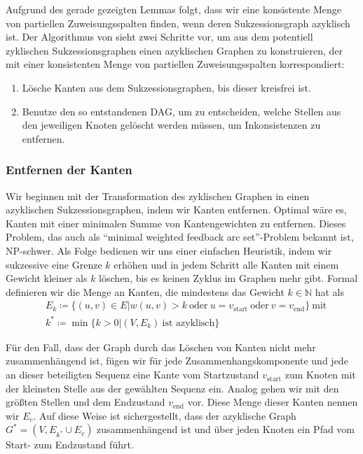 Aufgrund des gerade gezeigten Lemmas folgt, dass wir eine konsistente Menge von partiellen Zuweisungsspalten finden, wenn deren Sukzessionsgraph azyklisch ist. Der Algorithmus von \cite{pdc10} sieht zwei Schritte vor, um aus dem potentiell zyklischen Sukzessionsgraphen einen azyklischen Graphen zu konstruieren, der mit einer konsistenten Menge von partiellen Zuweisungsspalten korrespondiert:

\begin{enumerate}[topsep=0pt,itemsep=-1ex,partopsep=1ex,parsep=1ex]
	\item Lösche Kanten aus dem Sukzessionsgraphen, bis dieser kreisfrei ist.
	\item Benutze den so entstandenen DAG, um zu entscheiden, welche Stellen aus den jeweiligen Knoten gelöscht werden müssen, um Inkonsistenzen zu entfernen.
\end{enumerate}

\subsubsection{Entfernen der Kanten}

Wir beginnen mit der Transformation des zyklischen Graphen in einen azyklischen Sukzessionsgraphen, indem wir Kanten entfernen. Optimal wäre es, Kanten mit einer minimalen Summe von Kantengewichten zu entfernen. Dieses Problem, das auch als \enquote{minimal weighted feedback arc set}-Problem bekannt ist, NP-schwer. Als Folge bedienen wir uns einer einfachen Heuristik, indem wir sukzessive eine Grenze $k$ erhöhen und in jedem Schritt alle Kanten mit einem Gewicht kleiner als $k$ löschen, bis es keinen Zyklus im Graphen mehr gibt. Formal definieren wir die Menge an Kanten, die mindestens das Gewicht $k\in \mathbb{N}$ hat als 
\begin{equation}
\begin{split}
	& E_k \coloneqq \{(u,v)\in E | w(u,v) > k\: \text{oder}\: u = v_{\mathrm{start}}\: \text{oder}\: v = v_{\mathrm{end}}\}\: \text{mit} \\
	& k^* \coloneqq \min\{k > 0 | (V,E_k)\: \text{ist azyklisch}\}
\end{split}
\end{equation}

Für den Fall, dass der Graph durch das Löschen von Kanten nicht mehr zusammenhängend ist, fügen wir für jede Zusammenhangskomponente und jede an dieser beteiligten Sequenz eine Kante vom Startzustand $v_{\mathrm{start}}$ zum Knoten mit der kleinsten Stelle aus der gewählten Sequenz ein. Analog gehen wir mit den größten Stellen und dem Endzustand $v_{\mathrm{end}}$ vor. Diese Menge dieser Kanten nennen wir $E_c$. Auf diese Weise ist sichergestellt, dass der azyklische Graph $G^* = (V,E_{k^*}\cup E_c)$ zusammenhängend ist und über jeden Knoten ein Pfad vom Start- zum Endzustand führt.

